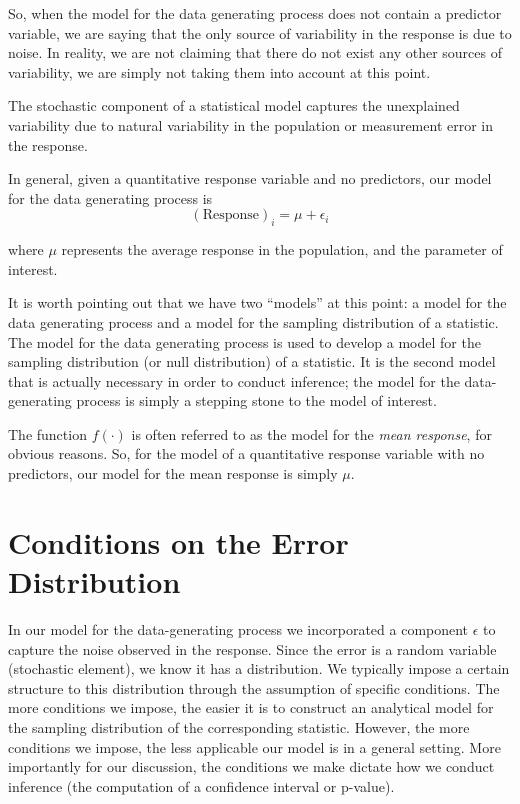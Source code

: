 \documentclass[]{book}
\theoremstyle{plain}
\theoremstyle{mydefn}
\theoremstyle{myexmpl}
\theoremstyle{remark}
\let\BeginKnitrBlock\begin \let\EndKnitrBlock\end
\let\BeginKnitrBlock\begin \let\EndKnitrBlock\end
\begin{document}
So, when the model for the data generating process does not contain a
predictor variable, we are saying that the only source of variability in
the response is due to noise. In reality, we are not claiming that there
do not exist any other sources of variability, we are simply not taking
them into account at this point.

\BeginKnitrBlock{rmdkeyidea}
The stochastic component of a statistical model captures the unexplained
variability due to natural variability in the population or measurement
error in the response.
\EndKnitrBlock{rmdkeyidea}

\BeginKnitrBlock{rmdtip}
In general, given a quantitative response variable and no predictors,
our model for the data generating process is
\[(\text{Response})_i = \mu + \epsilon_i\]

where \(\mu\) represents the average response in the population, and the
parameter of interest.
\EndKnitrBlock{rmdtip}

It is worth pointing out that we have two ``models'' at this point: a
model for the data generating process and a model for the sampling
distribution of a statistic. The model for the data generating process
is used to develop a model for the sampling distribution (or null
distribution) of a statistic. It is the second model that is actually
necessary in order to conduct inference; the model for the
data-generating process is simply a stepping stone to the model of
interest.

\BeginKnitrBlock{rmdtip}
The function \(f(\cdot)\) is often referred to as the model for the
\emph{mean response}, for obvious reasons. So, for the model of a
quantitative response variable with no predictors, our model for the
mean response is simply \(\mu\).
\EndKnitrBlock{rmdtip}

\section{Conditions on the Error
Distribution}\label{conditions-on-the-error-distribution}

In our model for the data-generating process we incorporated a component
\(\epsilon\) to capture the noise observed in the response. Since the
error is a random variable (stochastic element), we know it has a
distribution. We typically impose a certain structure to this
distribution through the assumption of specific conditions. The more
conditions we impose, the easier it is to construct an analytical model
for the sampling distribution of the corresponding statistic. However,
the more conditions we impose, the less applicable our model is in a
general setting. More importantly for our discussion, the conditions we
make dictate how we conduct inference (the computation of a confidence
interval or p-value).
\end{document}
